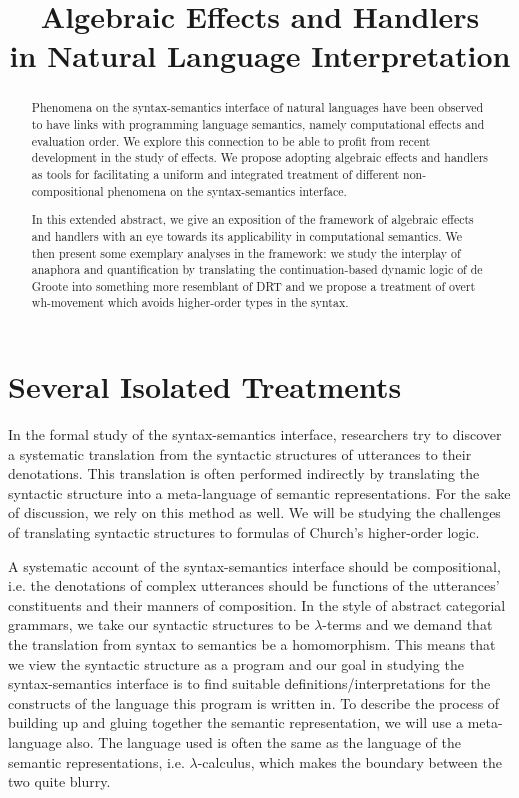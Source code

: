 \documentclass{article}
\title{Algebraic Effects and Handlers \\ in Natural Language Interpretation}
\begin{document}
\maketitle

\begin{abstract}
  Phenomena on the syntax-semantics interface of natural languages have been
  observed to have links with programming language semantics, namely
  computational effects and evaluation order. We explore this connection to be
  able to profit from recent development in the study of effects. We propose
  adopting algebraic effects and handlers as tools for facilitating a uniform
  and integrated treatment of different non-compositional phenomena on the
  syntax-semantics interface.

  In this extended abstract, we give an exposition of the framework of
  algebraic effects and handlers with an eye towards its applicability in
  computational semantics. We then present some exemplary analyses in the
  framework: we study the interplay of anaphora and quantification by
  translating the continuation-based dynamic logic of de Groote into something
  more resemblant of DRT and we propose a treatment of overt wh-movement which
  avoids higher-order types in the syntax.
\end{abstract}

\section{Several Isolated Treatments}

In the formal study of the syntax-semantics interface, researchers try to
discover a systematic translation from the syntactic structures of utterances
to their denotations. This translation is often performed indirectly by
translating the syntactic structure into a meta-language of semantic
representations. For the sake of discussion, we rely on this method as
well. We will be studying the challenges of translating syntactic structures
to formulas of Church's higher-order logic.

A systematic account of the syntax-semantics interface should be
compositional, i.e. the denotations of complex utterances should be functions
of the utterances' constituents and their manners of composition. In the style
of abstract categorial grammars, we take our syntactic structures to be
$\lambda$-terms and we demand that the translation from syntax to semantics be
a homomorphism. This means that we view the syntactic structure as a program
and our goal in studying the syntax-semantics interface is to find suitable
definitions/interpretations for the constructs of the language this program is
written in. To describe the process of building up and gluing together the
semantic representation, we will use a meta-language also. The language used
is often the same as the language of the semantic representations,
i.e. $\lambda$-calculus, which makes the boundary between the two quite
blurry.
\end{document}
